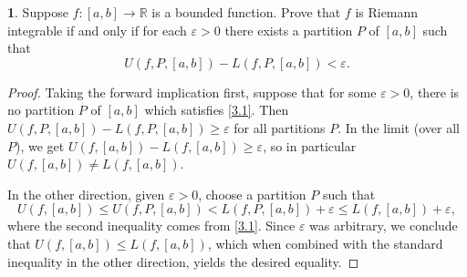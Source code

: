 \documentclass[12pt]{article}
\theoremstyle{definition}
\newtheorem{ex}{}
\begin{document}
\begin{ex}
	Suppose $f: [a, b] \to \mathbb{R}$ is a bounded function.
	Prove that $f$ is Riemann integrable if and only if for each $\varepsilon > 0$ there exists a partition $P$ of $[a, b]$ such that \begin{equation} \label{3.1}
		U(f, P, [a, b]) - L(f, P, [a, b]) < \varepsilon.
	\end{equation}
\end{ex}
\begin{proof}
	Taking the forward implication first, suppose that for some $\varepsilon > 0$, there is no partition $P$ of $[a, b]$ which satisfies \eqref{3.1}.
	Then $U(f, P, [a, b]) - L(f, P, [a, b]) \geq \varepsilon$ for all partitions $P$.
	In the limit (over all $P$), we get $U(f, [a, b]) - L(f, [a, b]) \geq  \varepsilon$, so in particular $U(f, [a, b]) \neq L(f, [a, b])$.

	In the other direction, given $\varepsilon > 0$, choose a partition $P$ such that \begin{equation*}
		U(f, [a, b]) \leq U(f, P, [a, b]) < L(f, P, [a, b]) + \varepsilon \leq L(f, [a, b]) + \varepsilon,
	\end{equation*}
	where the second inequality comes from \eqref{3.1}.
	Since $\varepsilon$ was arbitrary, we conclude that $U(f, [a, b]) \leq L(f, [a, b])$, which when combined with the standard inequality in the other direction, yields the desired equality.
\end{proof}
\end{document}
